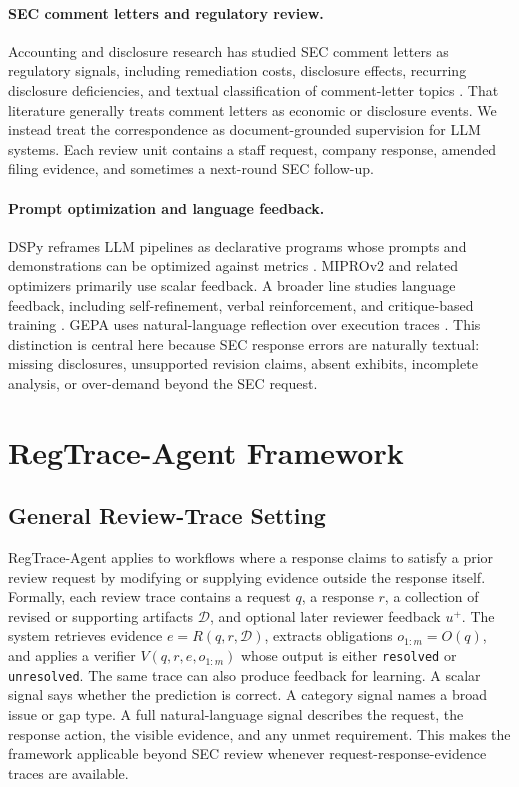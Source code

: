\documentclass[11pt]{article}
\newcommand{\framework}{RegTrace-Agent}
\begin{document}
\paragraph{SEC comment letters and regulatory review.}
Accounting and disclosure research has studied SEC comment letters as regulatory signals, including remediation costs, disclosure effects, recurring disclosure deficiencies, and textual classification of comment-letter topics \citep{cassell2013sec,bozanic2017sec,baugh2023auditor,ryans2021comment}. That literature generally treats comment letters as economic or disclosure events. We instead treat the correspondence as document-grounded supervision for LLM systems. Each review unit contains a staff request, company response, amended filing evidence, and sometimes a next-round SEC follow-up.

\paragraph{Prompt optimization and language feedback.}
DSPy reframes LLM pipelines as declarative programs whose prompts and demonstrations can be optimized against metrics \citep{khattab2023dspy}. MIPROv2 and related optimizers primarily use scalar feedback. A broader line studies language feedback, including self-refinement, verbal reinforcement, and critique-based training \citep{scheurer2022language,madaan2023selfrefine,shinn2023reflexion}. GEPA uses natural-language reflection over execution traces \citep{agrawal2026gepa}. This distinction is central here because SEC response errors are naturally textual: missing disclosures, unsupported revision claims, absent exhibits, incomplete analysis, or over-demand beyond the SEC request.

\section{\framework{} Framework}

\subsection{General Review-Trace Setting}

\framework{} applies to workflows where a response claims to satisfy a prior review request by modifying or supplying evidence outside the response itself. Formally, each review trace contains a request $q$, a response $r$, a collection of revised or supporting artifacts $\mathcal{D}$, and optional later reviewer feedback $u^+$. The system retrieves evidence $e=R(q,r,\mathcal{D})$, extracts obligations $o_{1:m}=O(q)$, and applies a verifier $V(q,r,e,o_{1:m})$ whose output is either \texttt{resolved} or \texttt{unresolved}.
The same trace can also produce feedback for learning. A scalar signal says whether the prediction is correct. A category signal names a broad issue or gap type. A full natural-language signal describes the request, the response action, the visible evidence, and any unmet requirement. This makes the framework applicable beyond SEC review whenever request-response-evidence traces are available.
\end{document}
